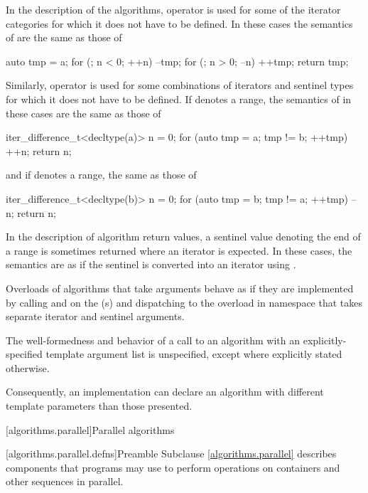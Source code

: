 \pnum
In the description of the algorithms, operator \tcode{+}
is used for some of the iterator categories
for which it does not have to be defined.
In these cases the semantics of  are the same as those of
\begin{codeblock}
auto tmp = a;
for (; n < 0; ++n) --tmp;
for (; n > 0; --n) ++tmp;
return tmp;
\end{codeblock}
Similarly, operator \tcode{-} is used
for some combinations of iterators and sentinel types
for which it does not have to be defined.
If  denotes a range,
the semantics of  in these cases are the same as those of
\begin{codeblock}
iter_difference_t<decltype(a)> n = 0;
for (auto tmp = a; tmp != b; ++tmp) ++n;
return n;
\end{codeblock}
and if  denotes a range, the same as those of
\begin{codeblock}
iter_difference_t<decltype(b)> n = 0;
for (auto tmp = b; tmp != a; ++tmp) --n;
return n;
\end{codeblock}

\pnum
In the description of algorithm return values,
a sentinel value  denoting the end of a range 
is sometimes returned where an iterator is expected.
In these cases,
the semantics are as if the sentinel is converted into an iterator using
.

\pnum
Overloads of algorithms that take  arguments
behave as if they are implemented by calling  and
 on the (s) and
dispatching to the overload in namespace 
that takes separate iterator and sentinel arguments.

\pnum
The well-formedness and behavior of a call to an algorithm with
an explicitly-specified template argument list
is unspecified, except where explicitly stated otherwise.
\begin{note}
Consequently, an implementation can declare an algorithm with
different template parameters than those presented.
\end{note}

[algorithms.parallel]{Parallel algorithms}

[algorithms.parallel.defns]{Preamble}
\pnum
Subclause \ref{algorithms.parallel} describes components that \Cpp{} programs may use
to perform operations on containers and other sequences in parallel.

